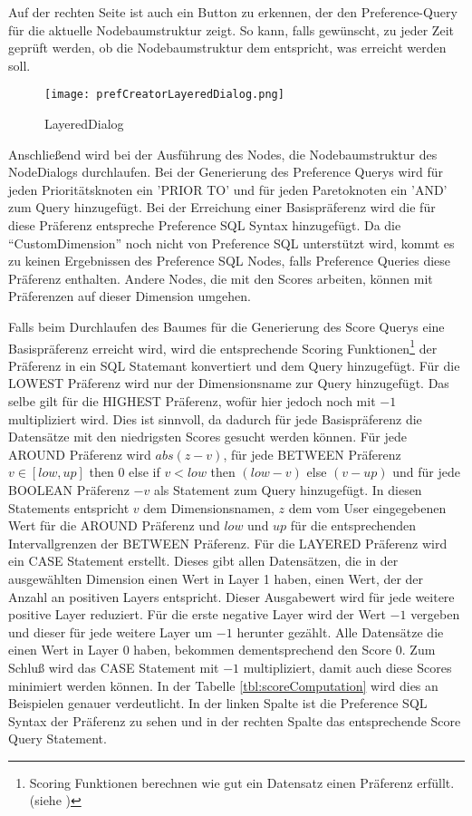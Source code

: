 Auf der rechten Seite ist auch ein Button zu erkennen, der den Preference-Query für die aktuelle Nodebaumstruktur zeigt. So kann, falls gewünscht, zu jeder Zeit geprüft werden, ob die Nodebaumstruktur dem entspricht, was erreicht werden soll. 

\begin{figure}[H]
	\centering
	\texttt{[image: prefCreatorLayeredDialog.png]}
	\caption{LayeredDialog}
	\label{img:prefCreatorLayeredDialog}
\end{figure}

Anschließend wird bei der Ausführung des Nodes, die Nodebaumstruktur des NodeDialogs durchlaufen.
Bei der Generierung des Preference Querys wird für jeden Prioritätsknoten ein 'PRIOR TO' und für jeden Paretoknoten ein 'AND' zum Query hinzugefügt. Bei der Erreichung einer Basispräferenz wird die für diese Präferenz entspreche Preference SQL Syntax hinzugefügt. Da die \enquote{CustomDimension} noch nicht von Preference SQL unterstützt wird, kommt es zu keinen Ergebnissen des Preference SQL Nodes, falls Preference Queries diese Präferenz enthalten. Andere Nodes, die mit den Scores arbeiten, können mit Präferenzen auf dieser Dimension umgehen. 

Falls beim Durchlaufen des Baumes für die Generierung des Score Querys eine Basispräferenz erreicht wird, wird die entsprechende Scoring Funktionen\footnote{Scoring Funktionen berechnen wie gut ein Datensatz einen Präferenz erfüllt. (siehe \cite{kiessling2002foundations})} der Präferenz in ein SQL Statemant konvertiert und dem Query hinzugefügt. Für die LOWEST Präferenz wird nur der Dimensionsname zur Query hinzugefügt. Das selbe gilt für die HIGHEST Präferenz, wofür hier jedoch noch mit $-1$ multipliziert wird. Dies ist sinnvoll, da dadurch für jede Basispräferenz die Datensätze mit den niedrigsten Scores gesucht werden können. Für jede AROUND Präferenz wird $abs(z-v)$, für jede BETWEEN Präferenz $v \in{[low, up]}$ then $0$ else if $v < low$ then $(low - v)$ else $(v - up)$ und für jede BOOLEAN Präferenz $-v$ als Statement zum Query hinzugefügt. In diesen Statements entspricht $v$ dem Dimensionsnamen, $z$ dem vom User eingegebenen Wert für die AROUND Präferenz und $low$ und $up$ für die entsprechenden Intervallgrenzen der BETWEEN Präferenz. 
Für die LAYERED Präferenz wird ein CASE Statement erstellt. Dieses gibt allen Datensätzen, die in der ausgewählten Dimension einen Wert in Layer 1 haben, einen Wert, der der Anzahl an positiven Layers  entspricht. Dieser Ausgabewert wird für jede weitere positive Layer reduziert. Für die erste negative Layer wird der Wert $-1$ vergeben und dieser für jede weitere Layer um $-1$ herunter gezählt. Alle Datensätze die einen Wert in Layer 0 haben, bekommen dementsprechend den Score 0. Zum Schluß wird das CASE Statement mit $-1$ multipliziert, damit auch diese Scores minimiert werden können.
In der Tabelle \ref{tbl:scoreComputation} wird dies an Beispielen genauer verdeutlicht. In der linken Spalte ist die Preference SQL Syntax der Präferenz zu sehen und in der rechten Spalte das entsprechende Score Query Statement. 

